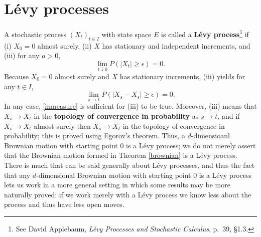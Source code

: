 \documentclass{article}
\theoremstyle{definition}
\theoremstyle{definition}
\begin{document}
\section{L\'evy processes}
A stochastic process $(X_t)_{t \in I}$ with state space $E$ is called a \textbf{L\'evy process}\footnote{See
David Applebaum, {\em L\'evy Processes and Stochastic Calculus}, p.~39, \S 1.3.}
 if
(i) $X_0=0$ almost surely, (ii) $X$ has stationary and independent increments, and (iii)
for any $a>0$,
\[
\lim_{t \downarrow 0} P(|X_{t}| \geq \epsilon) = 0.
\]
Because $X_0=0$ almost surely and $X$ has stationary increments, (iii) yields for
any $t \in I$,
\begin{equation}
\lim_{s \to t} P(|X_s-X_s| \geq \epsilon)=0.
\label{inmeasure}
\end{equation}
In any case, \eqref{inmeasure} is sufficient for (iii) to be true.
Moreover, (iii) means
that $X_s \to X_t$ in the \textbf{topology of convergence in probability} as $s \to t$, and 
if $X_s \to X_t$ almost surely then  $X_s \to X_t$ in the topology of convergence in probability; this is proved
using Egorov's theorem.
Thus, a $d$-dimensioanl Brownian motion with starting point $0$ is a L\'evy process; we do not merely assert that the Brownian motion
formed in Theorem \ref{brownian} is a L\'evy process.
There is much that can be said generally about L\'evy processes, and thus the fact that any $d$-dimensional Brownian motion with starting point $0$ is a L\'evy
process lets us work in a more general setting in which some results may be more naturally proved: if we work merely with a L\'evy process we know less about the process and thus have less open moves. 
\end{document}
